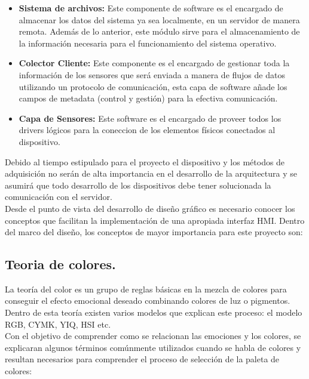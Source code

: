 \begin{itemize}
	\item \textbf{Sistema de archivos:} Este componente de software es el encargado de almacenar los datos del sistema ya sea localmente, en un servidor de manera remota. Además de lo anterior, este módulo sirve para el almacenamiento de la información necesaria para el funcionamiento del sistema operativo. 
    
	\item \textbf{Colector Cliente:} Este componente es el encargado de gestionar toda la información de los sensores que será enviada a manera de flujos de datos utilizando un protocolo de comunicación, esta capa de software añade los campos de metadata (control y gestión) para la efectiva comunicación.
	\item \textbf{Capa de Sensores:} Este software es el encargado de proveer todos los drivers lógicos para la coneccion de los elementos físicos conectados al dispositivo.
\end{itemize}

Debido al tiempo estipulado para el proyecto el dispositivo y los métodos de adquisición no serán de alta importancia en el desarrollo de la arquitectura y se asumirá que todo desarrollo de los dispositivos debe tener solucionada la comunicación con el servidor.
\vspace{0.5cm}\\
Desde el punto de vista del desarrollo de diseño gráfico es necesario conocer los conceptos que facilitan la implementación de una apropiada interfaz HMI. Dentro del marco del diseño, los conceptos de mayor importancia para este proyecto son:

\subsection{Teoria de colores.} 
La teoría del color es un grupo de reglas básicas en la mezcla de colores para conseguir el efecto emocional deseado combinando colores de luz o pigmentos. Dentro de esta teoría existen varios modelos que explican este proceso: el modelo RGB, CYMK, YIQ, HSI etc.
\\
Con el objetivo de comprender como se relacionan las emociones y los colores, se explicaran algunos términos comúnmente utilizados cuando se habla de colores y resultan necesarios para comprender el proceso de selección de la paleta de colores:

